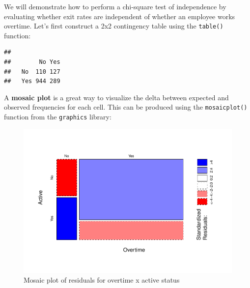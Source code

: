 \documentclass[
]{book}
\newenvironment{Shaded}{\begin{snugshade}}{\end{snugshade}}
\newcommand{\CommentTok}[1]{\textcolor[rgb]{0.56,0.35,0.01}{\textit{#1}}}
\newcommand{\FunctionTok}[1]{\textcolor[rgb]{0.00,0.00,0.00}{#1}}
\newcommand{\NormalTok}[1]{#1}
\newcommand{\OtherTok}[1]{\textcolor[rgb]{0.56,0.35,0.01}{#1}}
\newcommand{\SpecialCharTok}[1]{\textcolor[rgb]{0.00,0.00,0.00}{#1}}
\begin{document}
We will demonstrate how to perform a chi-square test of independence by evaluating whether exit rates are independent of whether an employee works overtime. Let's first construct a 2x2 contingency table using the \texttt{table()} function:

\begin{Shaded}
\end{Shaded}

\begin{verbatim}
##      
##        No Yes
##   No  110 127
##   Yes 944 289
\end{verbatim}

A \textbf{mosaic plot} is a great way to visualize the delta between expected and observed frequencies for each cell. This can be produced using the \texttt{mosaicplot()} function from the \texttt{graphics} library:

\begin{figure}

{\centering \includegraphics[width=1\linewidth]{The_Fundamentals_of_People_Analytics_files/figure-latex/mosaic-plot-1} 

}

\caption{Mosaic plot of residuals for overtime x active status}\label{fig:mosaic-plot}
\end{figure}
\end{document}
